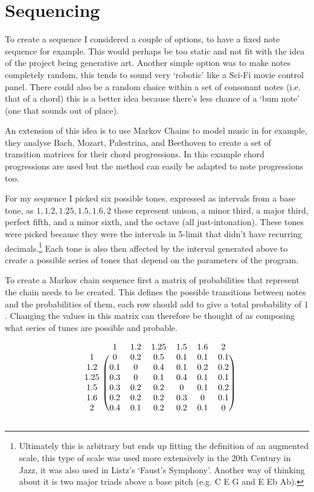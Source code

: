 \section{Sequencing}
\label{Sequencing}
To create a sequence I considered a couple of options, to have a fixed note
sequence for example. This would perhaps be too static and not fit with the idea
of the project being generative art. Another simple option was to make notes
completely random, this tends to sound very `robotic' like a Sci-Fi movie
control panel. There could also be a random choice within a set of consonant
notes (i.e. that of a chord) this is a better idea because there's less chance
of a `bum note' (one that sounds out of place).

An extension of this idea is to use Markov Chains to model music in
\citep{ballstate2016} for example, they analyse Bach, Mozart, Palestrina, and
Beethoven to create a set of transition matrices for their chord progressions.
In this example chord progressions are used but the method can easily be adapted
to note progressions too. 

For my sequence I picked six possible tones, expressed as intervals from a base
tone, as $1, 1.2, 1.25, 1.5, 1.6, 2$ these represent unison, a minor third, a
major third, perfect fifth, and a minor sixth, and the octave (all
just-intonation). These tones were picked because they were the intervals in
5-limit that didn't have recurring decimals.\footnote{Ultimately this is arbitrary but
ends up fitting the definition of an augmented scale, this type of scale was
used more extensively in the 20th Century in Jazz, it was also used in Listz's
`Faust's Symphony'. Another way of thinking about it is two major triads above a
base pitch (e.g. C E G and E Eb Ab).} Each tone is also then affected by the
interval generated above to create a possible series of tones that depend on the
parameters of the program.

To create a Markov chain sequence first a matrix of probabilities that represent
the chain needs to be created. This defines the possible transitions between
notes and the probabilities of them, each row should add to give a total
probability of $1$. Changing the values in this matrix can therefore be thought
of as composing what series of tunes are possible and probable.

\[
\begin{blockarray}{ccccccc}
    & 1 & 1.2 & 1.25 & 1.5 & 1.6 & 2\\
    \begin{block}{c (cccccc)}
        1    & 0  & 0.2& 0.5& 0.1& 0.1& 0.1\\
        1.2  & 0.1& 0  & 0.4& 0.1& 0.2& 0.2\\
        1.25 & 0.3& 0  & 0.1& 0.4& 0.1& 0.1\\
        1.5  & 0.3& 0.2& 0.2& 0  & 0.1& 0.2\\
        1.6  & 0.2& 0.2& 0.2& 0.3& 0  & 0.1\\
        2    & 0.4& 0.1& 0.2& 0.2& 0.1& 0  \\
    \end{block}
\end{blockarray}
\]

